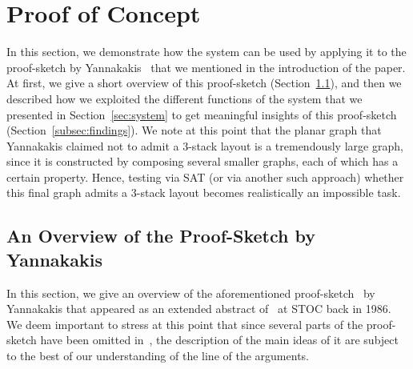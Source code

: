 \documentclass[runningheads]{llncs}
\begin{document}
\section{Proof of Concept}
\label{sec:proof-of-concept}

In this section, we demonstrate how the system can be used by applying it to the proof-sketch by Yannakakis~\cite{DBLP:conf/stoc/Yannakakis86} that we mentioned in the introduction of the paper. At first, we give a short overview of this proof-sketch (Section~\ref{subsec:Yannakakis}), and then we described how we exploited the different functions of the system that we presented in Section~\ref{sec:system} to get meaningful insights of this proof-sketch (Section~\ref{subsec:findings}). We note at this point that the planar graph that Yannakakis claimed not to admit a $3$-stack layout is a tremendously large graph, since it is constructed by composing several smaller graphs, each of which has a certain property. Hence, testing via SAT (or via another such approach) whether this final graph admits a $3$-stack layout becomes realistically an impossible task. 

\subsection{An Overview of the Proof-Sketch by Yannakakis}
\label{subsec:Yannakakis}

In this section, we give an overview of the aforementioned proof-sketch~\cite{DBLP:conf/stoc/Yannakakis86} by Yannakakis that appeared as an extended abstract of~\cite{DBLP:journals/jcss/Yannakakis89} at STOC back in 1986. We deem important to stress at this point that since several parts of the proof-sketch have been omitted in~\cite{DBLP:conf/stoc/Yannakakis86}, the description of the main ideas of it are subject to the best of our understanding of the line of the arguments. 
\end{document}
